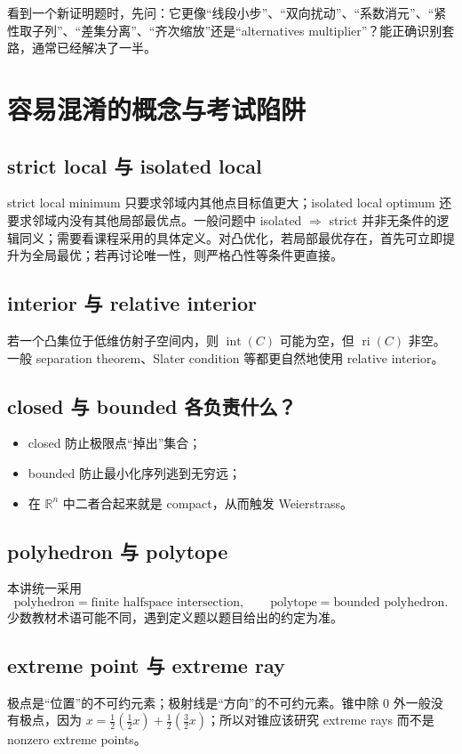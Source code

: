 \documentclass[11pt,a4paper,openany]{ctexrep}
\theoremstyle{definition}
\newcommand{\R}{\mathbb{R}}
\newcommand{\interior}{\operatorname{int}}
\newcommand{\ri}{\operatorname{ri}}
\begin{document}
\begin{exercisebox}[快速自测]
看到一个新证明题时，先问：它更像“线段小步”、“双向扰动”、“系数消元”、“紧性取子列”、“差集分离”、“齐次缩放”还是“alternatives multiplier”？能正确识别套路，通常已经解决了一半。
\end{exercisebox}

\chapter{容易混淆的概念与考试陷阱}

\section{strict local 与 isolated local}
strict local minimum 只要求邻域内其他点目标值更大；isolated local optimum 还要求邻域内没有其他局部最优点。一般问题中 isolated $\Rightarrow$ strict 并非无条件的逻辑同义；需要看课程采用的具体定义。对凸优化，若局部最优存在，首先可立即提升为全局最优；若再讨论唯一性，则严格凸性等条件更直接。

\section{interior 与 relative interior}
若一个凸集位于低维仿射子空间内，则 $\interior(C)$ 可能为空，但 $\ri(C)$ 非空。一般 separation theorem、Slater condition 等都更自然地使用 relative interior。

\section{closed 与 bounded 各负责什么？}
\begin{itemize}[leftmargin=2em]
  \item closed 防止极限点“掉出”集合；
  \item bounded 防止最小化序列逃到无穷远；
  \item 在 $\R^n$ 中二者合起来就是 compact，从而触发 Weierstrass。
\end{itemize}

\section{polyhedron 与 polytope}
本讲统一采用
\[
\text{polyhedron}=\text{finite halfspace intersection},
\qquad
\text{polytope}=\text{bounded polyhedron}.
\]
少数教材术语可能不同，遇到定义题以题目给出的约定为准。

\section{extreme point 与 extreme ray}
极点是“位置”的不可约元素；极射线是“方向”的不可约元素。锥中除 $0$ 外一般没有极点，因为 $x=\frac12(\frac12x)+\frac12(\frac32x)$；所以对锥应该研究 extreme rays 而不是 nonzero extreme points。
\end{document}
